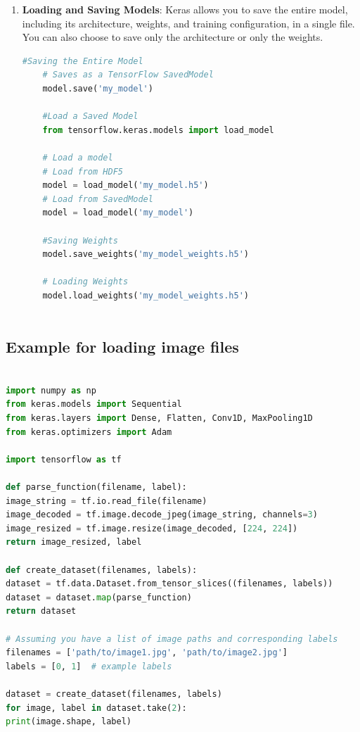 \begin{enumerate}
	\item \textbf{Loading and Saving Models}: Keras allows you to save the entire model, including its architecture, weights, and training configuration, in a single file. You can also choose to save only the architecture or only the weights.
	\begin{lstlisting}[language=python]
	#Saving the Entire Model
	# Saves as a TensorFlow SavedModel
	model.save('my_model')     
	
	#Load a Saved Model
	from tensorflow.keras.models import load_model
	
	# Load a model
	# Load from HDF5
	model = load_model('my_model.h5')
	# Load from SavedModel  
	model = load_model('my_model')   
	
	#Saving Weights
	model.save_weights('my_model_weights.h5')
	
	# Loading Weights
	model.load_weights('my_model_weights.h5')
	
	\end{lstlisting}
\end{enumerate}

	\subsection{Example for loading image files}\label{handlefileswithtensorflow}
	
		\begin{lstlisting}[language=python]
		
import numpy as np
from keras.models import Sequential
from keras.layers import Dense, Flatten, Conv1D, MaxPooling1D
from keras.optimizers import Adam
	
import tensorflow as tf

def parse_function(filename, label):
image_string = tf.io.read_file(filename)
image_decoded = tf.image.decode_jpeg(image_string, channels=3)
image_resized = tf.image.resize(image_decoded, [224, 224])
return image_resized, label

def create_dataset(filenames, labels):
dataset = tf.data.Dataset.from_tensor_slices((filenames, labels))
dataset = dataset.map(parse_function)
return dataset

# Assuming you have a list of image paths and corresponding labels
filenames = ['path/to/image1.jpg', 'path/to/image2.jpg']
labels = [0, 1]  # example labels

dataset = create_dataset(filenames, labels)
for image, label in dataset.take(2):
print(image.shape, label)
	\end{lstlisting}
	
